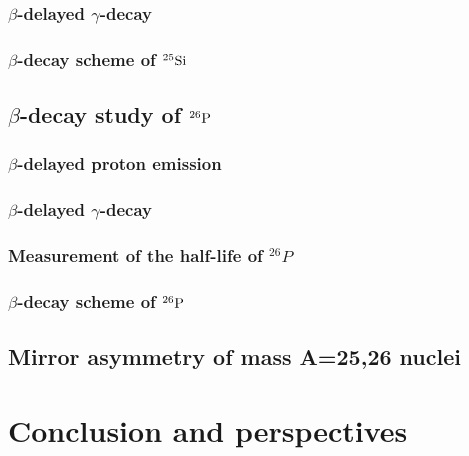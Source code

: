 \documentclass[UTF8]{ctexart}
\begin{document}
\subsubsection{$\beta$-delayed $\gamma$-decay}
\subsubsection{$\beta$-decay scheme of $^{25}\textnormal{Si}$}
\subsection{$\beta$-decay study of $^{26}\textnormal{P}$}
\subsubsection{$\beta$-delayed proton emission}
\subsubsection{$\beta$-delayed $\gamma$-decay}
\subsubsection{Measurement of the half-life of $^{26}P$}
\subsubsection{$\beta$-decay scheme of $^{26}\textnormal{P}$}
\subsection{Mirror asymmetry of mass A=25,26 nuclei}
\section{Conclusion and perspectives}
\end{document}

